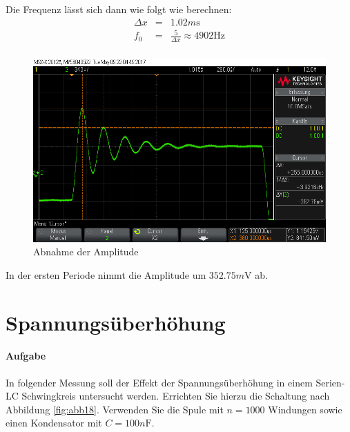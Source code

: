 \documentclass[10pt]{scrreprt}
\begin{document}
        Die Frequenz lässt sich dann wie folgt wie berechnen:
        \begin{eqnarray}
            \Delta x &=& 1.02 \si{m \second}\\
            f_0 &=& \frac{5}{\Delta x} \approx 4902\si{\hertz}\\
        \end{eqnarray}
        \begin{center}
            \begin{figure}[H]
                \includegraphics[width=\textwidth]{scope_20.png}
                \caption{Abnahme der Amplitude}
                \label{fig:SpanAbn2}
            \end{figure}
        \end{center}

        In der ersten Periode nimmt die Amplitude um $352.75 \si{m \volt}$ ab.

        \section{Spannungsüberhöhung}
        \paragraph{Aufgabe}
        In folgender Messung soll der Effekt der Spannungsüberhöhung in einem Serien-LC Schwingkreis
        untersucht werden. Errichten Sie hierzu die Schaltung nach Abbildung
        \ref{fig:abb18}. Verwenden Sie die Spule mit $n = 1000$ Windungen sowie einen Kondensator mit
        $C = 100\si{n\farad}$.
\end{document}
